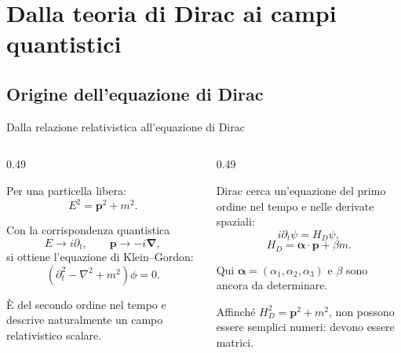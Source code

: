 \section{Dalla teoria di Dirac ai campi quantistici}

\subsection{Origine dell'equazione di Dirac}

\begin{frame}{Dalla relazione relativistica all'equazione di Dirac}
\small

\begin{columns}[T,onlytextwidth]
\begin{column}{0.49\textwidth}

Per una particella libera:
\[
E^2=\mathbf p^2+m^2.
\]

Con la corrispondenza quantistica
\[
E\to i\partial_t,\qquad
\mathbf p\to-i\boldsymbol\nabla,
\]
si ottiene l'equazione di Klein--Gordon:
\[
(\partial_t^2-\nabla^2+m^2)\phi=0.
\]

È del secondo ordine nel tempo e descrive
naturalmente un campo relativistico scalare.

\end{column}
\begin{column}{0.49\textwidth}

Dirac cerca un'equazione del primo ordine
nel tempo e nelle derivate spaziali:
\[
i\partial_t\psi=H_D\psi,
\]
\[
H_D=\boldsymbol\alpha\cdot\mathbf p+\beta m.
\]

Qui
$\boldsymbol\alpha=(\alpha_1,\alpha_2,\alpha_3)$
e $\beta$ sono ancora da determinare.

Affinché $H_D^2=\mathbf p^2+m^2$, non
possono essere semplici numeri:
devono essere matrici.

\end{column}
\end{columns}

\end{frame}

